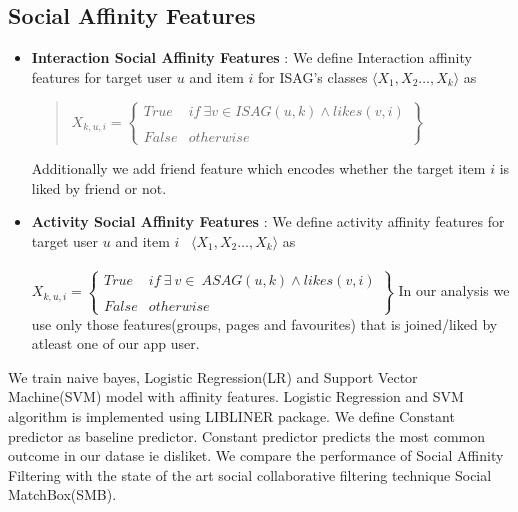 \subsection{Social Affinity Features}
\begin{itemize}
  \item \textbf{Interaction Social Affinity Features} : We define Interaction affinity features for target user $u$ and item $i$ for ISAG's classes 
  $ \langle X_{1},X_{2}\ldots,X_{k}\rangle$ as
  \begin{quote}
  \begin{math}
   X_{k,u,i} = \begin{Bmatrix}
   		True & if\ \exists v\in ISAG(u,k) \wedge likes(v,i)\\ \\
   		False & otherwise
   \end{Bmatrix}
  \end{math}
  \end{quote}
  Additionally we add friend feature which encodes whether the target item $i$ is liked by friend or not.
  \item \textbf{Activity Social Affinity Features} : We define activity affinity features for target user $u$ and item $i$   \
  $ \langle X_{1},X_{2}\ldots,X_{k}\rangle$ as\\ \\
  \begin{math}
   X_{k,u,i} = \begin{Bmatrix}
   		True & if\ \exists\ v\in \ ASAG(u,k) \wedge likes(v,i)\\ \\
   		False & otherwise
   \end{Bmatrix}
  \end{math}
	In our analysis we use only those features(groups, pages and favourites) that is joined/liked by atleast one of our app user.
\end{itemize}

We train naive bayes, Logistic Regression(LR) and Support Vector Machine(SVM) model with affinity features.
Logistic Regression and SVM algorithm is implemented using LIBLINER \cite{liblinear} package. 
We define Constant predictor as baseline predictor. Constant predictor predicts the most common outcome in our datase ie disliket.
We compare the performance of Social Affinity Filtering with the state of the art social collaborative filtering technique 
Social MatchBox(SMB)\cite{SMB}.

